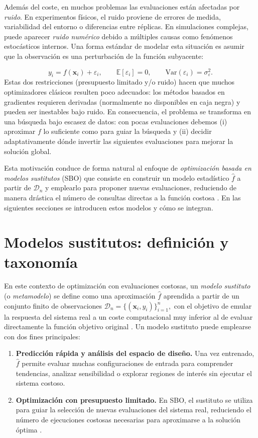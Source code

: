 Además del coste, en muchos problemas las evaluaciones están afectadas por \emph{ruido}. En experimentos físicos, el ruido proviene de errores de medida, variabilidad del entorno o diferencias entre réplicas. En simulaciones complejas, puede aparecer \emph{ruido numérico} debido a múltiples causas como fenómenos estocásticos internos. Una forma estándar de modelar esta situación es asumir que la observación es una perturbación de la función subyacente:

\[
y_i = f(\bm{x}_i) + \varepsilon_i, 
\qquad 
\mathbb{E}[\varepsilon_i]=0,
\qquad 
\mathrm{Var}(\varepsilon_i)=\sigma_\varepsilon^2.
\]
Estas dos restricciones (presupuesto limitado y/o ruido) hacen que muchos optimizadores clásicos resulten poco adecuados: los métodos basados en gradientes requieren derivadas (normalmente no disponibles en caja negra) y pueden ser inestables bajo ruido. En consecuencia, el problema se transforma en una búsqueda bajo escasez de datos: con pocas evaluaciones debemos (i) aproximar $f$ lo suficiente como para guiar la búsqueda y (ii) decidir adaptativamente dónde invertir las siguientes evaluaciones para mejorar la solución global.

Esta motivación conduce de forma natural al enfoque de \emph{optimización basada en modelos sustitutos} (SBO) que consiste en construir un modelo estadístico $\hat{f}$ a partir de $\mathcal{D}_n$ y emplearlo para proponer nuevas evaluaciones, reduciendo de manera drástica el número de consultas directas a la función costosa \cite{forrester2008engineering,jiang2020surrogate}. En las siguientes secciones se introducen estos modelos y cómo se integran.

\section{Modelos sustitutos: definición y taxonomía}
\label{sec:surrogates_def_tax}

En este contexto de optimización con evaluaciones costosas, un \emph{modelo sustituto}
(o \emph{metamodelo}) se define como una aproximación $\hat{f}$ aprendida a partir de un
conjunto finito de observaciones
$
\mathcal{D}_n=\{(\bm{x}_i,y_i)\}_{i=1}^n,$
con el objetivo de emular la respuesta del sistema real a un coste computacional muy
inferior al de evaluar directamente la función objetivo original \cite{forrester2008engineering,jiang2020surrogate}.
\newline
Un modelo sustituto puede emplearse con dos fines principales:
\begin{enumerate}
  \item \textbf{Predicción rápida y análisis del espacio de diseño.} Una vez entrenado,
  $\hat{f}$ permite evaluar muchas configuraciones de entrada para comprender tendencias,
  analizar sensibilidad o explorar regiones de interés sin ejecutar el sistema costoso.
  \item \textbf{Optimización con presupuesto limitado.} En SBO,
  el sustituto se utiliza para guiar la selección de nuevas evaluaciones del sistema real,
  reduciendo el número de ejecuciones costosas necesarias para aproximarse a la solución
  óptima \cite{jiang2020surrogate}.
\end{enumerate}

